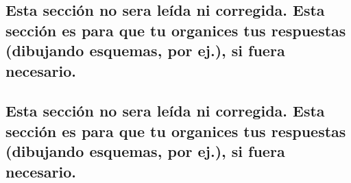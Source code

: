 \documentclass{article}
\begin{document}
\subsection*{Esta secci\'on no sera le\'ida ni corregida. Esta secci\'on es para que tu organices tus respuestas (dibujando esquemas, por ej.), si fuera necesario.}
\clearpage
\newpage

\subsection*{Esta secci\'on no sera le\'ida ni corregida. Esta secci\'on es para que tu organices tus respuestas (dibujando esquemas, por ej.), si fuera necesario.}
\clearpage
\newpage
\end{document}
